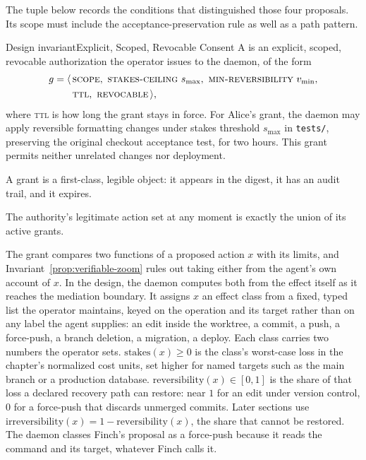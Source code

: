 \documentclass[11pt,a4paper]{article}
\theoremstyle{definition}
\theoremstyle{plain}
\begin{document}
The tuple below records the conditions that distinguished those four proposals.
Its scope must include the acceptance-preservation rule as well as a path pattern.

\begin{pdclaim}{Design invariant}{Explicit, Scoped, Revocable Consent}
\setlength{\parskip}{4pt plus 1pt}
\label{def:consent}
A  is an explicit, scoped, revocable authorization the
operator issues to the daemon, of the form
\[
\begin{aligned}
g = \langle\, &\textsc{scope},\ \textsc{stakes-ceiling}\ s_{\max},\ \textsc{min-reversibility}\ v_{\min},\\
&\textsc{ttl},\ \textsc{revocable}\,\rangle,
\end{aligned}
\]
where \textsc{ttl} is how long the grant stays in force. For Alice's grant, the daemon may apply reversible formatting changes under
stakes threshold $s_{\max}$ in \texttt{tests/}, preserving the original checkout
acceptance test, for two hours. This grant permits neither unrelated changes
nor deployment.

A grant is a
first-class, legible object: it appears in the digest, it has an audit trail, and it
expires.

The authority's legitimate action set at any moment is exactly the union of
its active grants.
\end{pdclaim}

The grant compares two functions of a proposed action $x$ with its limits, and
Invariant~\ref{prop:verifiable-zoom} rules out taking either from the agent's
own account of $x$. In the design, the daemon computes both from the effect
itself as it reaches the mediation boundary. It assigns $x$ an effect class from
a fixed, typed list the operator maintains, keyed on the operation and its
target rather than on any label the agent supplies: an edit inside the worktree,
a commit, a push, a force-push, a branch deletion, a migration, a deploy. Each
class carries two numbers the operator sets. $\mathrm{stakes}(x)\ge0$ is the
class's worst-case loss in the chapter's normalized cost units, set higher for
named targets such as the main branch or a production database.
$\mathrm{reversibility}(x)\in[0,1]$ is the share of that loss a declared recovery
path can restore: near $1$ for an edit under version control, $0$ for a
force-push that discards unmerged commits. Later sections use
$\mathrm{irreversibility}(x)=1-\mathrm{reversibility}(x)$, the share that cannot
be restored. The daemon classes Finch's proposal as a force-push because it
reads the command and its target, whatever Finch calls it.
\end{document}
